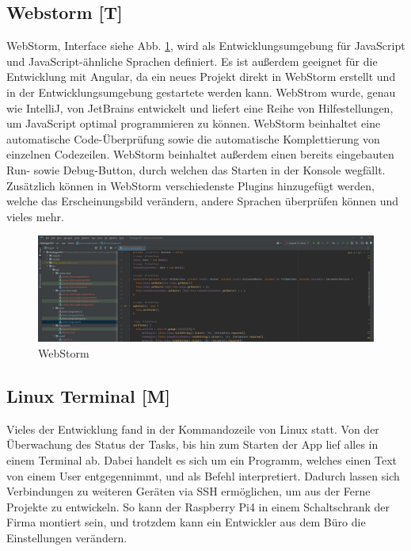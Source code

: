 \subsection{Webstorm [T]} 
WebStorm, Interface siehe Abb. \ref{fig:impl:webstorm}, wird als Entwicklungsumgebung für JavaScript und JavaScript-ähnliche Sprachen definiert. Es ist außerdem geeignet für die Entwicklung mit Angular, da ein neues Projekt direkt in WebStorm erstellt und in der Entwicklungsumgebung gestartete werden kann. WebStrom wurde, genau wie IntelliJ, von JetBrains entwickelt und liefert eine Reihe von Hilfestellungen, um JavaScript optimal programmieren zu können. WebStorm beinhaltet eine automatische Code-Überprüfung sowie die automatische Komplettierung von einzelnen Codezeilen. WebStorm beinhaltet außerdem einen bereits eingebauten Run- sowie Debug-Button, durch welchen das Starten in der Konsole wegfällt. Zusätzlich können in WebStorm verschiedenste Plugins hinzugefügt werden, welche das Erscheinungsbild verändern, andere Sprachen überprüfen können und vieles mehr. \cite{webstormOfficialSite}

\begin{figure}[h t]
    \centering
    \includegraphics[scale=0.38]{pics/webstorm.jpg}
    \caption{WebStorm}
    \label{fig:impl:webstorm}
  \end{figure}


\subsection{Linux Terminal [M]} 
Vieles der Entwicklung fand in der Kommandozeile von Linux statt. Von der Überwachung des Status der Tasks, bis hin zum Starten der App lief alles in einem Terminal ab. Dabei handelt es sich um ein Programm, welches einen Text von einem User entgegennimmt, und als Befehl interpretiert. Dadurch lassen sich Verbindungen zu weiteren Geräten via SSH ermöglichen, um aus der Ferne Projekte zu entwickeln. So kann der Raspberry Pi4 in einem Schaltschrank der Firma montiert sein, und trotzdem kann ein Entwickler aus dem Büro die Einstellungen verändern.   

